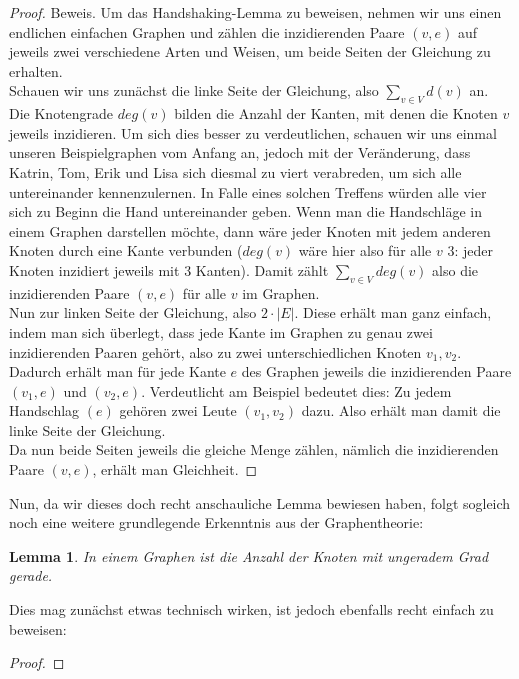 \documentclass{article}
\newtheorem{lemma}{Lemma}
\begin{document}
\bigskip
\begin{proof}{Beweis.}
	Um das Handshaking-Lemma zu beweisen, nehmen wir uns einen endlichen einfachen Graphen und zählen die inzidierenden Paare $(v, e)$ auf jeweils zwei verschiedene Arten und Weisen, um beide Seiten der Gleichung zu erhalten.\\
	Schauen wir uns zunächst die linke Seite der Gleichung, also $\sum_{v \in V}d(v)$ an. Die Knotengrade $deg(v)$ bilden die Anzahl der Kanten, mit denen die Knoten $v$ jeweils inzidieren. Um sich dies besser zu verdeutlichen, schauen wir uns einmal unseren Beispielgraphen vom Anfang an, jedoch mit der Veränderung, dass Katrin, Tom, Erik und Lisa sich diesmal zu viert verabreden, um sich alle untereinander kennenzulernen. In Falle eines solchen Treffens würden alle vier sich zu Beginn die Hand untereinander geben. Wenn man die Handschläge in einem Graphen darstellen möchte, dann wäre jeder Knoten mit jedem anderen Knoten durch eine Kante verbunden ($deg(v)$ wäre hier also für alle $v$ $3$: jeder Knoten inzidiert jeweils mit $3$ Kanten). Damit zählt $\sum_{v \in V}deg(v)$ also die inzidierenden Paare $(v, e)$ für alle $v$ im Graphen.\\
	Nun zur linken Seite der Gleichung, also $2 \cdot |E|$. Diese erhält man ganz einfach, indem man sich überlegt, dass jede Kante im Graphen zu genau zwei inzidierenden Paaren gehört, also zu zwei unterschiedlichen Knoten $v_1, v_2$. Dadurch erhält man für jede Kante $e$ des Graphen jeweils die inzidierenden Paare $(v_1, e)$ und $(v_2, e)$. Verdeutlicht am Beispiel bedeutet dies: Zu jedem Handschlag $(e)$ gehören zwei Leute $(v_1, v_2)$ dazu. Also erhält man damit die linke Seite der Gleichung.\\
	Da nun beide Seiten jeweils die gleiche Menge zählen, nämlich die inzidierenden Paare $(v, e)$, erhält man Gleichheit.
\end{proof}
\bigskip
Nun, da wir dieses doch recht anschauliche Lemma bewiesen haben, folgt sogleich noch eine weitere grundlegende Erkenntnis aus der Graphentheorie:\\
\begin{lemma}
	In einem Graphen ist die Anzahl der Knoten mit \emph{ungeradem Grad} gerade.\\
\end{lemma}
\bigskip
Dies mag zunächst etwas technisch wirken, ist jedoch ebenfalls recht einfach zu beweisen:
\begin{proof}
\end{proof}
\newpage
\end{document}
